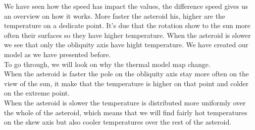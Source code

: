 We have seen how the speed has impact the values, the difference speed gives us an overview on how it works.
More faster the asteroid his, higher are the temperature on a dedicate point. It's due that the rotation show to the sun more often their surfaces so they have higher temperature.
When the asteroid is slower we see that only the obliquity axis have hight temperature. We have created our model as we have presented before. \\[10pt]
To go through, we will look on why the thermal model map change.\\ [10pt]
When the asteroid is faster the pole on the obliquity axis stay more often on the view of the sun, it make that the temperature is higher on that point and colder on the extreme point.\\ [10pt]
When the asteroid is slower the temperature is distributed more uniformly over the whole of the asteroid, which means that we will find fairly hot temperatures on the skew axis but also cooler temperatures over the rest of the asteroid.\\[11pt]
